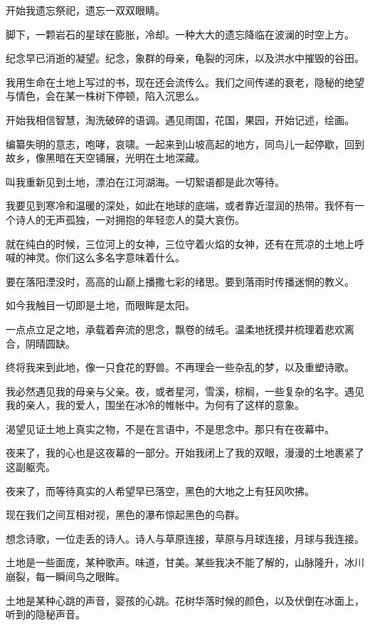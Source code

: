 \documentclass[UTF8]{article}
\begin{document}
\par 开始我遗忘祭祀，遗忘一双双眼睛。
\par 脚下，一颗岩石的星球在膨胀，冷却。一种大大的遗忘降临在波澜的时空上方。
\par 纪念早已消逝的凝望。纪念，象群的母亲，龟裂的河床，以及洪水中摧毁的谷田。
\par 我用生命在土地上写过的书，现在还会流传么。我们之间传递的衰老，隐秘的绝望与情色，会在某一株树下停顿，陷入沉思么。
\par 开始我相信智慧，淘洗破碎的语调。遇见雨国，花国，果园，开始记述，绘画。
\par 编纂失明的意志，咆哮，哀啸。一起来到山坡高起的地方，同鸟儿一起停歇，回到故乡，像黑暗在天空铺展，光明在土地深藏。
\par 叫我重新见到土地，漂泊在江河湖海。一切絮语都是此次等待。
\par 我要见到寒冷和温暖的深处，如此在地球的底端，或者靠近湿润的热带。我怀有一个诗人的无声孤独，一对拥抱的年轻恋人的莫大哀伤。
\par 就在纯白的时候，三位河上的女神，三位守着火焰的女神，还有在荒凉的土地上呼喊的神灵。你们这么多名字意味着什么。
\par 要在落阳湮没时，高高的山巅上播撒七彩的绪思。要到落雨时传播迷惘的教义。
\par 如今我触目一切即是土地，而眼眸是太阳。
\par 一点点立足之地，承载着奔流的思念，飘卷的绒毛。温柔地抚摸并梳理着悲欢离合，阴晴圆缺。
\par 终将我来到此地，像一只食花的野兽。不再理会一些杂乱的梦，以及重塑诗歌。
\par 我必然遇见我的母亲与父亲。夜，或者星河，雪溪，棕榈，一些复杂的名字。遇见我的亲人，我的爱人，围坐在冰冷的帷帐中。为何有了这样的意象。
\par 渴望见证土地上真实之物，不是在言语中，不是思念中。那只有在夜幕中。
\par 夜来了，我的心也是这夜幕的一部分。开始我闭上了我的双眼，漫漫的土地裹紧了这副躯壳。
\par 夜来了，而等待真实的人希望早已落空，黑色的大地之上有狂风吹拂。
\par 现在我们之间互相对视，黑色的瀑布惊起黑色的鸟群。
\\[0.6cm]
\par 想念诗歌，一位走丢的诗人。诗人与草原连接，草原与月球连接，月球与我连接。
\par 土地是一些面庞，某种歌声。味道，甘美。某些我决不能了解的，山脉隆升，冰川崩裂，每一瞬间鸟之眼眸。
\par 土地是某种心跳的声音，婴孩的心跳。花树华落时候的颜色，以及伏倒在冰面上，听到的隐秘声音。
\end{document}
